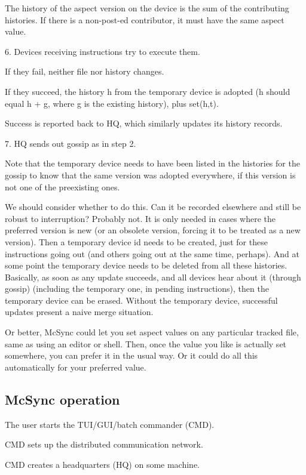 \documentclass{book}
\begin{document}
The history of the aspect version on the device is the sum of the contributing histories.  If there is a non-post-ed contributor, it must have the same aspect value.

6.
Devices receiving instructions try to execute them.

If they fail, neither file nor history changes.

If they succeed, the history h from the temporary device is adopted (h should equal h + g, where g is the existing history), plus set(h,t).

Success is reported back to HQ, which similarly updates its history records.

7.
HQ sends out gossip as in step 2.

Note that the temporary device needs to have been listed in the histories for the gossip to know that the same version was adopted everywhere, if this version is not one of the preexisting ones.

We should consider whether to do this.  Can it be recorded elsewhere and still be robust to interruption?  Probably not.  It is only needed in cases where the preferred version is new (or an obsolete version, forcing it to be treated as a new version).  Then a temporary device id needs to be created, just for these instructions going out (and others going out at the same time, perhaps).  And at some point the temporary device needs to be deleted from all these histories.  Basically, as soon as any update succeeds, and all devices hear about it (through gossip) (including the temporary one, in pending instructions), then the temporary device can be erased.  Without the temporary device, successful updates present a naive merge situation.

Or better, McSync could let you set aspect values on any particular tracked file, same as using an editor or shell.  Then, once the value you like is actually set somewhere, you can prefer it in the usual way.  Or it could do all this automatically for your preferred value.



\subsection{McSync operation}

The user starts the TUI/GUI/batch commander (CMD).

CMD sets up the distributed communication network.

CMD creates a headquarters (HQ) on some machine.
\end{document}
